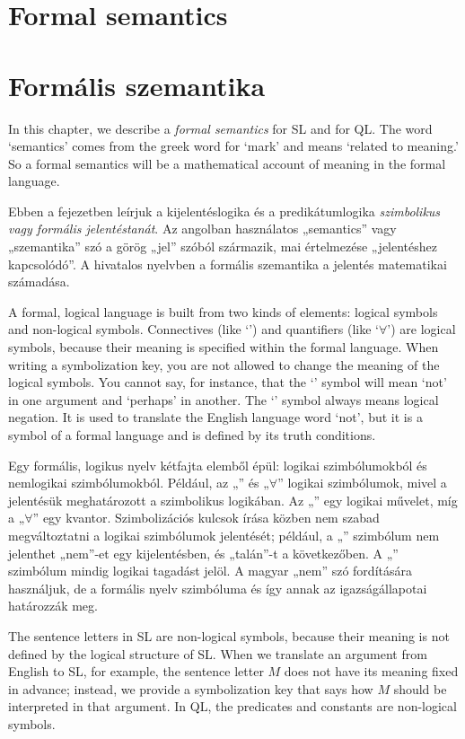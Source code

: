 
\chapter*{Formal semantics}
\label{ch.semantics}
\chapter{Formális szemantika}
\label{ch.semantics}

In this chapter, we describe a \emph{formal semantics} for SL and for QL. The word `semantics' comes from the greek word for `mark' and means `related to meaning.' So a formal semantics will be a mathematical account of meaning in the formal language.

Ebben a fejezetben leírjuk a kijelentéslogika és a predikátumlogika \emph{szimbolikus vagy formális jelentéstanát}. Az angolban használatos „semantics” vagy „szemantika” szó a görög „jel” szóból származik, mai értelmezése „jelentéshez kapcsolódó”. A hivatalos nyelvben a formális szemantika a jelentés matematikai számadása.


A formal, logical language is built from two kinds of elements: logical symbols and non-logical symbols. Connectives (like `\eand') and quantifiers (like `$\forall$') are logical symbols, because their meaning is specified within the formal language. When writing a symbolization key, you are not allowed to change the meaning of the logical symbols. You cannot say, for instance, that the `\enot' symbol will mean `not' in one argument and `perhaps' in another. The `\enot' symbol always means logical negation. It is used to translate the English language word `not', but it is a symbol of a formal language and is defined by its truth conditions.

Egy formális, logikus nyelv kétfajta elemből épül: logikai szimbólumokból és nemlogikai szimbólumokból. Például, az „\eand” és „$\forall$” logikai szimbólumok, mivel a jelentésük meghatározott a szimbolikus logikában. Az „\eand” egy logikai művelet, míg a „$\forall$” egy kvantor. Szimbolizációs kulcsok írása közben nem szabad megváltoztatni a logikai szimbólumok jelentését; például, a „\enot” szimbólum nem jelenthet „nem”-et egy kijelentésben, és „talán”-t a következőben. A „\enot” szimbólum mindig logikai tagadást jelöl. A magyar „nem” szó fordítására használjuk, de a formális nyelv szimbóluma és így annak az igazságállapotai határozzák meg.


The sentence letters in SL are non-logical symbols, because their meaning is not defined by the logical structure of SL. When we translate an argument from English to SL, for example, the sentence letter $M$ does not have its meaning fixed in advance; instead, we provide a symbolization key that says how $M$ should be interpreted in that argument. In QL, the predicates and constants are non-logical symbols.

